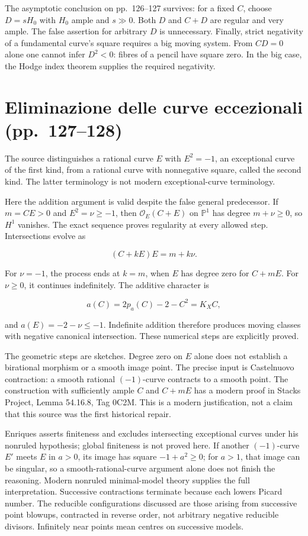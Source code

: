 The asymptotic conclusion on pp.~126--127 survives: for a fixed \(C\), choose \(D=sH_0\) with \(H_0\) ample and \(s\gg0\). Both \(D\) and \(C+D\) are regular and very ample. The false assertion for arbitrary \(D\) is unnecessary. Finally, strict negativity of a fundamental curve's square requires a big moving system. From \(CD=0\) alone one cannot infer \(D^2<0\): fibres of a pencil have square zero. In the big case, the Hodge index theorem supplies the required negativity.

\section[Curve eccezionali]{Eliminazione delle curve eccezionali (pp.~127--128)}\label{enriques-iv-9}

The source distinguishes a rational curve \(E\) with \(E^2=-1\), an exceptional curve of the first kind, from a rational curve with nonnegative square, called the second kind. The latter terminology is not modern exceptional-curve terminology.

Here the addition argument is valid despite the false general predecessor. If \(m=CE>0\) and \(E^2=\nu\ge-1\), then \(\mathcal O_E(C+E)\) on \(\mathbb P^1\) has degree \(m+\nu\ge0\), so \(H^1\) vanishes. The exact sequence proves regularity at every allowed step. Intersections evolve as

\[
(C+kE)E=m+k\nu.
\]

For \(\nu=-1\), the process ends at \(k=m\), when \(E\) has degree zero for \(C+mE\). For \(\nu\ge0\), it continues indefinitely. The additive character is

\[
a(C)=2p_a(C)-2-C^2=K_X C,
\]

and \(a(E)=-2-\nu\le-1\). Indefinite addition therefore produces moving classes with negative canonical intersection. These numerical steps are explicitly proved.

The geometric steps are sketches. Degree zero on \(E\) alone does not establish a birational morphism or a smooth image point. The precise input is Castelnuovo contraction: a smooth rational \((-1)\)-curve contracts to a smooth point. The construction with sufficiently ample \(C\) and \(C+mE\) has a modern proof in Stacks Project, Lemma 54.16.8, Tag 0C2M. This is a modern justification, not a claim that this source was the first historical repair.

Enriques asserts finiteness and excludes intersecting exceptional curves under his nonruled hypothesis; global finiteness is not proved here. If another \((-1)\)-curve \(E'\) meets \(E\) in \(a>0\), its image has square \(-1+a^2\ge0\); for \(a>1\), that image can be singular, so a smooth-rational-curve argument alone does not finish the reasoning. Modern nonruled minimal-model theory supplies the full interpretation. Successive contractions terminate because each lowers Picard number. The reducible configurations discussed are those arising from successive point blowups, contracted in reverse order, not arbitrary negative reducible divisors. Infinitely near points mean centres on successive models.


